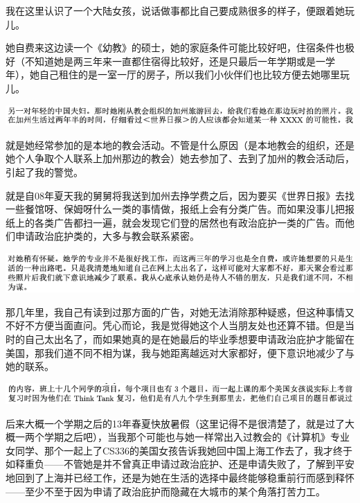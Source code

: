 \documentclass[9pt, b5paper]{article}
\begin{document}
我在这里认识了一个大陆女孩，说话做事都比自己要成熟很多的样子，便跟着她玩儿。 

她自费来这边读一个《幼教》的硕士，她的家庭条件可能比较好吧，住宿条件也极好（不知道她是两三年来一直都住宿得比较好，还是只最后一年学期或是一学年），她自己租住的是一室一厅的房子，所以我们小伙伴们也比较方便去她哪里玩儿。 

\begin{center}
\includegraphics[width=.9\linewidth]{./pic/backups_plans_20210502_153959.png}
\end{center}

就是她经常参加的是本地的教会活动。不管是什么原因（是本地教会的组织，还是她个人争取个人联系上加州那边的教会）她去参加了、去到了加州的教会活动后，引起了我的警觉。

就是自08年夏天我的舅舅将我送到加州去挣学费之后，因为要买《世界日报》去找一些餐馆呀、保姆呀什么一类的事情做，报纸上会有分类广告。而如果没事儿把报纸上的各类广告都扫一遍，就会发现它们登的居然也有政治庇护一类的广告。而他们申请政治庇护类的，大多与教会联系紧密。 

\begin{center}
\includegraphics[width=.9\linewidth]{./pic/backups_plans_20210502_154458.png}
\end{center}

那几年里，我自己有读到过那方面的广告，对她无法消除那种疑惑，但这种事情又不好不方便当面直问。凭心而论，我是觉得她这个人当朋友处也还算不错。但是当时的自己太出名了，而如果她真的是在她最后的毕业季想要申请政治庇护才能留在美国，那我们道不同不相为谋，我与她距离越远对大家都好，便下意识地减少了与她的联系。

\begin{center}
\includegraphics[width=.9\linewidth]{./pic/backups_plans_20210502_155228.png}
\end{center}

后来大概一个学期之后的13年春夏快放暑假（这里记得不是很清楚了，就是过了大概一两个学期之后吧），当我那个可能也与她一样常出入过教会的《计算机》专业女同学、那个一起上了CS336的美国女孩告诉我她回中国上海工作去了，我才终于如释重负——不管她是并不曾真正申请过政治庇护、还是申请失败了，了解到平安地回到了上海并已经工作，还是为她在生活的选择中最终能够稳重前行而感到释怀——至少不至于因为申请了政治庇护而隐藏在大城市的某个角落打苦力工。
\end{document}
